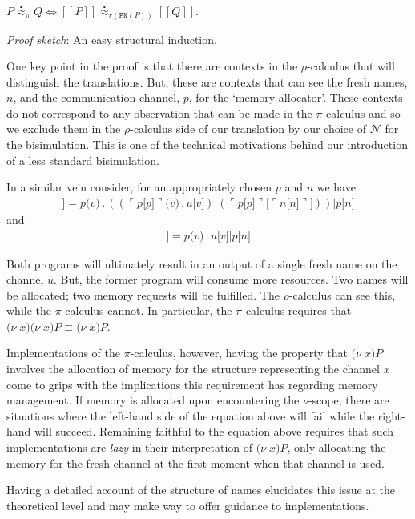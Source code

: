 \documentclass[]{entcs}
\newcommand{\ldb}{[\![}
\newcommand{\rdb}{]\!]}
\newcommand{\lpquote}{\ulcorner}
\newcommand{\rpquote}{\urcorner}
\newcommand{\newkw}{\nu}
\newcommand{\id}[1]{\texttt{#1}}
\newcommand{\juxtap}{\mathbin{\id{|}}}
\newcommand{\concat}{\mathbin{.}}
\newcommand{\binpar}[2]{#1 \juxtap #2}
\newcommand{\outputp}[2]{#1 \id{[} #2 \id{]}}
\newcommand{\prefix}[3]{#1 \id{(} #2 \id{)} \concat #3}
\newcommand{\quotep}[1]{\lpquote #1 \rpquote}
\newcommand{\newp}[2]{\id{(}\newkw \; #1 \id{)} #2}
\newcommand{\meaningof}[1]{\ldb #1 \rdb}
\newcommand{\wbbisim}{\stackrel{\centerdot}{\approx}} %
\newcommand{\pic}{$\pi$-calculus}
\newcommand{\rhoc}{$\rho$-calculus}
\begin{document}
\begin{theorem}[Correctness]	
	$P \wbbisim_{\pi} Q \iff \ldb P \rdb \wbbisim_{r(\texttt{FN}(P))} \ldb Q \rdb$.
\end{theorem}

\emph{Proof sketch}: An easy structural induction.

One key point in the proof is that there are contexts in the {\rhoc}
that will distinguish the translations. But, these are contexts that
can see the fresh names, $n$, and the communication channel, $p$, for
the `memory allocator'. These contexts do not correspond to any
observation that can be made in the {\pic} and so we exclude them in
the {\rhoc} side of our translation by our choice of ${\mathcal N}$
for the bisimulation. This is one of the technical motivations behind
our introduction of a less standard bisimulation.

\begin{example}
	In a similar vein consider, for an appropriately chosen $p$ and $n$ we have
	\begin{eqnarray}
		\meaningof{\newp{v}{\newp{v}{\outputp{u}{v}}}} = 
			\binpar{\prefix{p}{v}{(\binpar{(\prefix{\quotep{\outputp{p}{p}}}{v}{\outputp{u}{v}})}
					              {(\outputp{\quotep{\outputp{p}{p}}}{\quotep{\outputp{n}{n}}})})}}
			       {\outputp{p}{n}} \nonumber
	\end{eqnarray}
	and
	\begin{eqnarray}
		\meaningof{\newp{v}{\outputp{u}{v}}} = 
				\binpar	{\prefix{p}{v}{\outputp{u}{v}}}
			       		{\outputp{p}{n}} \nonumber
	\end{eqnarray}

	Both programs will ultimately result in an output of a single
	fresh name on the channel $u$. But, the former program will
	consume more resources. Two names will be allocated; two memory
	requests will be fulfilled. The {\rhoc} can see this, while the
	{\pic} cannot. In particular, the {\pic} requires that
	$\newp{x}{\newp{x}{P}} \equiv \newp{x}{P}$.

	Implementations of the {\pic}, however, having the property that
	${\newp{x}{P}}$ involves the allocation of memory for the
	structure representing the channel $x$ come to grips with the
	implications this requirement has regarding memory management. If
	memory is allocated upon encountering the $\nu$-scope, there are
	situations where the left-hand side of the equation above will
	fail while the right-hand will succeed. Remaining faithful to the
	equation above requires that such implementations are
	\textit{lazy} in their interpretation of ${\newp{x}{P}}$, only
	allocating the memory for the fresh channel at the first moment
	when that channel is used.

	Having a detailed account of the structure of names elucidates
	this issue at the theoretical level and may make way to offer
	guidance to implementations.
\end{example}
\end{document}
